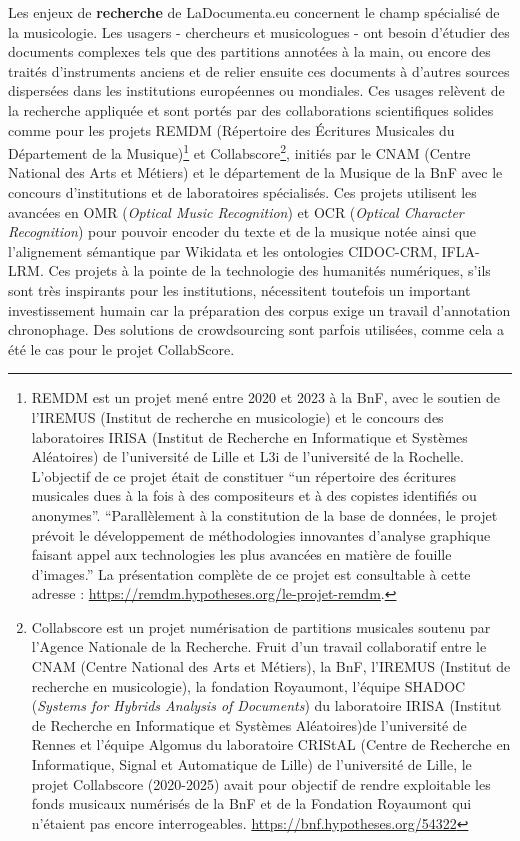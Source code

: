 Les enjeux de \textbf{recherche} de LaDocumenta.eu concernent le champ spécialisé de la musicologie. Les usagers - chercheurs et musicologues - ont besoin d’étudier des documents complexes tels que des partitions annotées à la main, ou encore des traités d’instruments anciens et de relier ensuite ces documents à d’autres sources dispersées dans les institutions européennes ou mondiales. Ces usages relèvent de la recherche appliquée et sont portés par des collaborations scientifiques solides comme pour les projets REMDM (Répertoire des Écritures Musicales du Département de la Musique)\footnote{REMDM est un projet mené entre 2020 et 2023 à la BnF, avec le soutien de l'IREMUS (Institut de recherche en musicologie) et le concours des laboratoires IRISA (Institut de Recherche en Informatique et Systèmes Aléatoires) de l'université de Lille et L3i de l'université de la Rochelle. L'objectif de ce projet était de constituer \enquote{un répertoire des écritures musicales dues à la fois à des compositeurs et à des copistes identifiés ou anonymes}. \enquote{Parallèlement à la constitution de la base de données, le projet prévoit le développement de méthodologies innovantes d’analyse graphique faisant appel aux technologies les plus avancées en matière de fouille d’images.} La présentation complète de ce projet est consultable à cette adresse : \url{https://remdm.hypotheses.org/le-projet-remdm}.} et Collabscore\footnote{Collabscore est un projet numérisation de partitions musicales soutenu par l'Agence Nationale de la Recherche. Fruit d'un travail collaboratif entre le CNAM (Centre National des Arts et Métiers), la BnF, l'IREMUS (Institut de recherche en musicologie), la fondation Royaumont, l'équipe SHADOC (\textit{Systems for Hybrids Analysis of Documents}) du laboratoire IRISA (Institut de Recherche en Informatique et Systèmes Aléatoires)de l'université de Rennes et l'équipe Algomus du laboratoire CRIStAL (Centre de Recherche en Informatique, Signal et Automatique de Lille) de l'université de Lille, le projet Collabscore (2020-2025) avait pour objectif de rendre exploitable les fonds musicaux numérisés de la BnF et de la Fondation Royaumont qui n'étaient pas encore interrogeables. \url{https://bnf.hypotheses.org/54322}}, initiés par le CNAM (Centre National des Arts et Métiers) et le département de la Musique de la BnF avec le concours d'institutions et de laboratoires spécialisés. Ces projets utilisent les avancées en OMR (\textit{Optical Music Recognition}) et OCR (\textit{Optical Character Recognition}) pour pouvoir encoder du texte et de la musique notée ainsi que l'alignement sémantique par Wikidata et les ontologies CIDOC-CRM, IFLA-LRM. Ces projets à la pointe de la technologie des humanités numériques, s'ils sont très inspirants pour les institutions, nécessitent toutefois un important investissement humain car la préparation des corpus exige un travail d'annotation chronophage. Des solutions de crowdsourcing sont parfois utilisées, comme cela a été le cas pour le projet CollabScore. 


